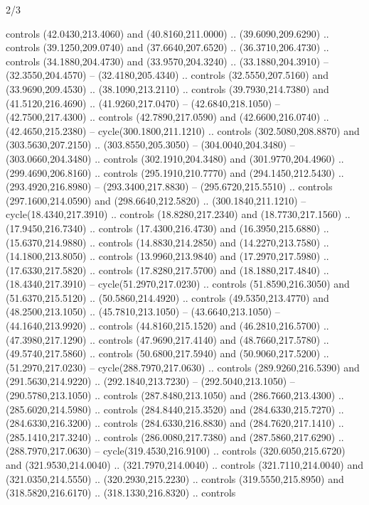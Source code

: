 \begin{flagdescription}{2/3}
\begin{scope}[xshift=0.5\flaglength,yshift=0.5\flagwidth,scale=\stretchfactor]
\begin{scope}[scale=0.001645\flagwidth,yshift=65mm,xshift=-63mm]
\begin{scope}[y=0.80pt, x=0.80pt, yscale=-1,]
\begin{scope}[cm={{1.33333,0.0,0.0,1.33333,(0.0,1e-05)}}]
  controls (42.0430,213.4060) and (40.8160,211.0000) .. (39.6090,209.6290) ..
  controls (39.1250,209.0740) and (37.6640,207.6520) .. (36.3710,206.4730) ..
  controls (34.1880,204.4730) and (33.9570,204.3240) .. (33.1880,204.3910) --
  (32.3550,204.4570) -- (32.4180,205.4340) .. controls (32.5550,207.5160) and
  (33.9690,209.4530) .. (38.1090,213.2110) .. controls (39.7930,214.7380) and
  (41.5120,216.4690) .. (41.9260,217.0470) -- (42.6840,218.1050) --
  (42.7500,217.4300) .. controls (42.7890,217.0590) and (42.6600,216.0740) ..
  (42.4650,215.2380) -- cycle(300.1800,211.1210) .. controls (302.5080,208.8870)
  and (303.5630,207.2150) .. (303.8550,205.3050) -- (304.0040,204.3480) --
  (303.0660,204.3480) .. controls (302.1910,204.3480) and (301.9770,204.4960) ..
  (299.4690,206.8160) .. controls (295.1910,210.7770) and (294.1450,212.5430) ..
  (293.4920,216.8980) -- (293.3400,217.8830) -- (295.6720,215.5510) .. controls
  (297.1600,214.0590) and (298.6640,212.5820) .. (300.1840,211.1210) --
  cycle(18.4340,217.3910) .. controls (18.8280,217.2340) and (18.7730,217.1560)
  .. (17.9450,216.7340) .. controls (17.4300,216.4730) and (16.3950,215.6880) ..
  (15.6370,214.9880) .. controls (14.8830,214.2850) and (14.2270,213.7580) ..
  (14.1800,213.8050) .. controls (13.9960,213.9840) and (17.2970,217.5980) ..
  (17.6330,217.5820) .. controls (17.8280,217.5700) and (18.1880,217.4840) ..
  (18.4340,217.3910) -- cycle(51.2970,217.0230) .. controls (51.8590,216.3050)
  and (51.6370,215.5120) .. (50.5860,214.4920) .. controls (49.5350,213.4770)
  and (48.2500,213.1050) .. (45.7810,213.1050) -- (43.6640,213.1050) --
  (44.1640,213.9920) .. controls (44.8160,215.1520) and (46.2810,216.5700) ..
  (47.3980,217.1290) .. controls (47.9690,217.4140) and (48.7660,217.5780) ..
  (49.5740,217.5860) .. controls (50.6800,217.5940) and (50.9060,217.5200) ..
  (51.2970,217.0230) -- cycle(288.7970,217.0630) .. controls (289.9260,216.5390)
  and (291.5630,214.9220) .. (292.1840,213.7230) -- (292.5040,213.1050) --
  (290.5780,213.1050) .. controls (287.8480,213.1050) and (286.7660,213.4300) ..
  (285.6020,214.5980) .. controls (284.8440,215.3520) and (284.6330,215.7270) ..
  (284.6330,216.3200) .. controls (284.6330,216.8830) and (284.7620,217.1410) ..
  (285.1410,217.3240) .. controls (286.0080,217.7380) and (287.5860,217.6290) ..
  (288.7970,217.0630) -- cycle(319.4530,216.9100) .. controls
  (320.6050,215.6720) and (321.9530,214.0040) .. (321.7970,214.0040) .. controls
  (321.7110,214.0040) and (321.0350,214.5550) .. (320.2930,215.2230) .. controls
  (319.5550,215.8950) and (318.5820,216.6170) .. (318.1330,216.8320) .. controls

\end{scope}
\end{scope}
\end{scope}
\end{scope}
\end{flagdescription}
